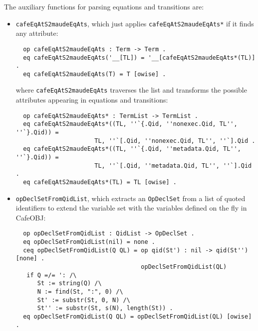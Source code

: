 The auxiliary functions for parsing equations and transitions are:

\begin{itemize}
\item
\verb"cafeEqAtS2maudeEqAts", which just applies \texttt{cafeEqAtS2maudeEqAts*}
if it finds any attribute:

{\codesize
\begin{verbatim}
  op cafeEqAtS2maudeEqAts : Term -> Term .
  eq cafeEqAtS2maudeEqAts('__[TL]) = '__[cafeEqAtS2maudeEqAts*(TL)] .
  eq cafeEqAtS2maudeEqAts(T) = T [owise] .
\end{verbatim}
}

\noindent
where \texttt{cafeEqAtS2maudeEqAts} traverses the list and transforms
the possible attributes appearing in equations and transitions:

{\codesize
\begin{verbatim}
  op cafeEqAtS2maudeEqAts* : TermList -> TermList .
  eq cafeEqAtS2maudeEqAts*((TL, ''`{.Qid, ''nonexec.Qid, TL'', ''`}.Qid)) =
                      TL, ''`[.Qid, ''nonexec.Qid, TL'', ''`].Qid .
  eq cafeEqAtS2maudeEqAts*((TL, ''`{.Qid, ''metadata.Qid, TL'', ''`}.Qid)) =
                      TL, ''`[.Qid, ''metadata.Qid, TL'', ''`].Qid .
  eq cafeEqAtS2maudeEqAts*(TL) = TL [owise] .
\end{verbatim}
}

\item
\verb"opDeclSetFromQidList", which extracts an \verb"OpDeclSet" from a list of quoted
identifiers to extend the variable set with the variables defined on the fly in CafeOBJ:

{\codesize
\begin{verbatim}
  op opDeclSetFromQidList : QidList -> OpDeclSet .
  eq opDeclSetFromQidList(nil) = none .
  ceq opDeclSetFromQidList(Q QL) = op qid(St') : nil -> qid(St'') [none] .
                                   opDeclSetFromQidList(QL)
   if Q =/= ': /\
      St := string(Q) /\
      N := find(St, ":", 0) /\
      St' := substr(St, 0, N) /\
      St'' := substr(St, s(N), length(St)) .
  eq opDeclSetFromQidList(Q QL) = opDeclSetFromQidList(QL) [owise] .
\end{verbatim}
}

\end{itemize}


{\codesize
\begin{comment}
  ceq parseCafeDecl('reduce_.[T], PU, U, VDS, DB) = < PDR, nil, DB >
   if PDR := < PU ; U ; VDS > .

  ceq parseCafeDecl('red_.[T], PU, U, VDS, DB) = < PDR, nil, DB >
   if PDR := < PU ; U ; VDS > .
\end{comment}
}

